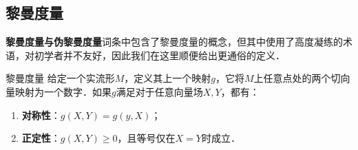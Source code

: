 

\subsection{黎曼度量}

\textbf{黎曼度量与伪黎曼度量}词条中包含了黎曼度量的概念，但其中使用了高度凝练的术语，对初学者并不友好，因此我们在这里顺便给出更通俗的定义．

\begin{definition}{黎曼度量}
给定一个实流形$M$，定义其上一个映射$g$，它将$M$上任意点处的两个切向量映射为一个数字．如果$g$满足对于任意向量场$X, Y$，都有：
\begin{enumerate}
\item \textbf{对称性}：$g(X, Y)=g(y, X)$；
\item \textbf{正定性}：$g(X, Y)\geq 0$，且等号仅在$X=Y$时成立．
\end{enumerate}

\end{definition}





